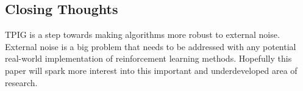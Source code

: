 \documentclass[letterpaper]{article} %
\begin{document}
\subsection{Closing Thoughts}
TPIG is a step towards making algorithms more robust to external noise. External noise is a big problem that needs to be addressed with any potential real-world implementation of reinforcement learning methods. Hopefully this paper will spark more interest into this important and underdeveloped area of research.


%
%
%
%
%
\end{document}
